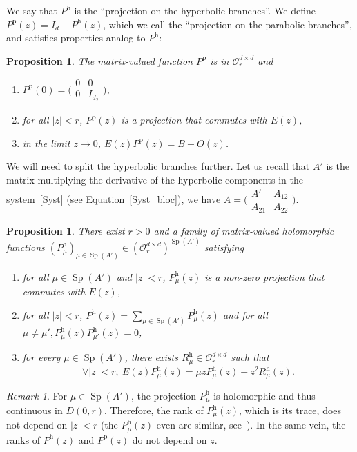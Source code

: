 \documentclass[10pt]{amsart}
\let\mathcal\mathscr
\theoremstyle{plain}
\newtheorem{prop}[theorem]{Proposition}
\theoremstyle{definition}
\theoremstyle{remark}
\newtheorem{remark}[theorem]{Remark}
\DeclareMathOperator{\Sp}{Sp}
\let\bigO O
\newcommand{\hol}{{\mathcal O}}
\newcommand{\h}{{\mathrm h}}
\newcommand{\p}{{\mathrm p}}
\begin{document}
We say that $P^\h$ is the ``projection on the hyperbolic branches''. We define $P^\p(z) = I_d - P^\h(z)$, which we call the ``projection on the parabolic branches'', and satisfies properties analog to $P^\h$:
\begin{prop}\label{th:perturb_parab}
The matrix-valued function $P^\p$ is in $\hol_{r}^{d\times d}$ and
\begin{enumerate}
\item $P^\p(0) = \big(\begin{smallmatrix}0&0\\0&I_{d_2} \end{smallmatrix} \big)$,
\item for all $|z|<r$, $P^\p(z)$ is a projection that commutes with $E(z)$,
\item in the limit $z\to 0$, $E(z)P^\p(z) = B + \bigO(z)$.
\end{enumerate}
\end{prop}

We will need to split the hyperbolic branches further. Let us recall that $A'$ is the matrix multiplying the derivative of the hyperbolic components in the system~\eqref{Syst} (see Equation~\eqref{Syst_bloc}), \ie we have $A = \big(\begin{smallmatrix}A'&A_{12}\\A_{21}&A_{22}\end{smallmatrix}\big)$.
\begin{prop}\label{th:perturb}
There exist $r>0$ and a family of matrix-valued holomorphic functions $(P_\mu^\h)_{\mu\in\Sp(A')} \in (\hol_{r}^{d\times d})^{\Sp(A')}$ satisfying
\begin{enumerate}
\item
\label{eigenprojection}
for all $\mu \in \Sp(A')$ and $|z|<r$, $P_\mu^\h(z)$ is a non-zero projection that commutes with $E(z)$,
\item
\label{Decompeigenprojection}
for all $|z|<r$, $P^\h(z) = \sum_{\mu \in \Sp(A')} P^\h_\mu(z)$ and for all $\mu\neq \mu', P_\mu^\h(z) P_{\mu'}^\h(z) = 0$,
\item
\label{defAsymHyp}
for every $\mu\in \Sp(A')$, there exists $R_\mu^{\h} \in \mathcal{O}_{r}^{d\times d}$ such that
\begin{equation*}
\forall |z|<r,\ E(z)P_\mu^\h(z) = \mu z P_\mu^\h(z) + z^2R_\mu^\h(z).
\end{equation*}
\end{enumerate}
\end{prop}

\begin{remark}
\label{RmkRk}
For $\mu \in \Sp(A')$, the projection $P_\mu^\h$ is holomorphic and thus continuous in $D(0,r)$. Therefore, the rank of $P_\mu^\h(z)$, which is its trace, does not depend on $|z|<r$ (the $P_\mu^\h(z)$ even are similar, see~\cite[Ch.\,I, \S4.6, Lem.\,4.10]{kato_1995}). In the same vein, the ranks of $P^\h(z)$ and $P^\p(z)$ do not depend on $z$.
\end{remark}
\end{document}
